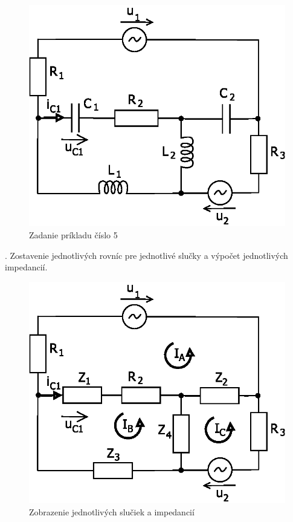 \documentclass[a4paper,12pt]{article}
\begin{document}
\begin{figure}[!htb]
\centering
\includegraphics[scale=1.2]{p5/p0.eps}
\caption{Zadanie príkladu číslo 5}
\end{figure}


. Zostavenie jednotlivých rovníc pre jednotlivé slučky a výpočet jednotlivých impedancií.
\begin{figure}[!htb]
\centering
\includegraphics[scale=1.0]{p5/p1.eps}
\caption{Zobrazenie jednotlivých slučiek a impedancií}
\end{figure}
\end{document}
